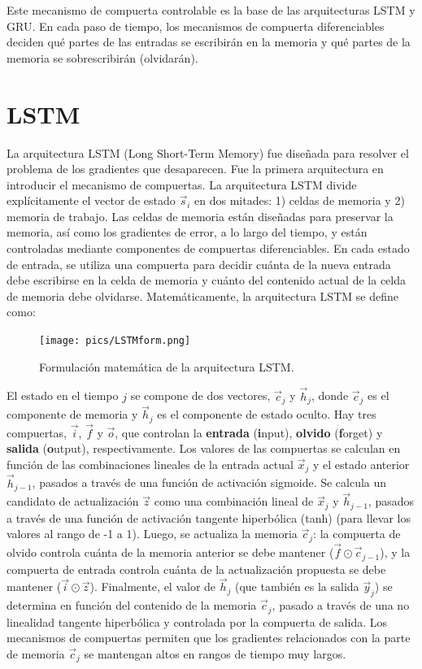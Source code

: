 Este mecanismo de compuerta controlable es la base de las arquitecturas LSTM y GRU. En cada paso de tiempo, los mecanismos de compuerta diferenciables deciden qué partes de las entradas se escribirán en la memoria y qué partes de la memoria se sobrescribirán (olvidarán).

\section{LSTM}
La arquitectura LSTM (Long Short-Term Memory) \cite{hochreiter1997long} fue diseñada para resolver el problema de los gradientes que desaparecen. Fue la primera arquitectura en introducir el mecanismo de compuertas. La arquitectura LSTM divide explícitamente el vector de estado $\vec{s}_i$ en dos mitades: 1) celdas de memoria y 2) memoria de trabajo. Las celdas de memoria están diseñadas para preservar la memoria, así como los gradientes de error, a lo largo del tiempo, y están controladas mediante componentes de compuertas diferenciables. En cada estado de entrada, se utiliza una compuerta para decidir cuánta de la nueva entrada debe escribirse en la celda de memoria y cuánto del contenido actual de la celda de memoria debe olvidarse. Matemáticamente, la arquitectura LSTM se define como:

\begin{figure}[h]
\centering
  \texttt{[image: pics/LSTMform.png]}
  \caption{Formulación matemática de la arquitectura LSTM.}
\end{figure}

El estado en el tiempo $j$ se compone de dos vectores, $\vec{c}_j$ y $\vec{h}_{j}$, donde $\vec{c}_j$ es el componente de memoria y $\vec{h}_j$ es el componente de estado oculto. Hay tres compuertas, $\vec{i}$, $\vec{f}$ y $\vec{o}$, que controlan la \textbf{entrada} (\textbf{i}nput), \textbf{olvido} (\textbf{f}orget) y \textbf{salida} (\textbf{o}utput), respectivamente. Los valores de las compuertas se calculan en función de las combinaciones lineales de la entrada actual $\vec{x}_j$ y el estado anterior $\vec{h}_{j-1}$, pasados a través de una función de activación sigmoide. Se calcula un candidato de actualización $\vec{z}$ como una combinación lineal de $\vec{x}_j$ y $\vec{h}_{j-1}$, pasados a través de una función de activación tangente hiperbólica (tanh) (para llevar los valores al rango de -1 a 1). Luego, se actualiza la memoria $\vec{c}_j$: la compuerta de olvido controla cuánta de la memoria anterior se debe mantener ($\vec{f} \odot \vec{c}_{j-1}$), y la compuerta de entrada controla cuánta de la actualización propuesta se debe mantener ($\vec{i} \odot  \vec{z}$). Finalmente, el valor de $\vec{h}_j$ (que también es la salida $\vec{y}_j$) se determina en función del contenido de la memoria $\vec{c}_j$, pasado a través de una no linealidad tangente hiperbólica y controlada por la compuerta de salida. Los mecanismos de compuertas permiten que los gradientes relacionados con la parte de memoria $\vec{c}_j$ se mantengan altos en rangos de tiempo muy largos.

